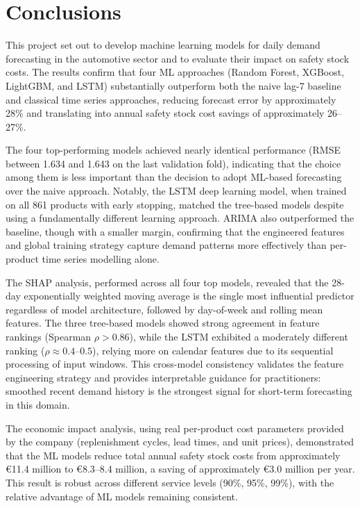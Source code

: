 
\section{Conclusions}

This project set out to develop machine learning models for daily demand forecasting in the automotive sector and to evaluate their impact on safety stock costs. The results confirm that four ML approaches (Random Forest, XGBoost, LightGBM, and LSTM) substantially outperform both the naive lag-7 baseline and classical time series approaches, reducing forecast error by approximately 28\% and translating into annual safety stock cost savings of approximately 26--27\%.

The four top-performing models achieved nearly identical performance (RMSE between 1.634 and 1.643 on the last validation fold), indicating that the choice among them is less important than the decision to adopt ML-based forecasting over the naive approach. Notably, the LSTM deep learning model, when trained on all 861 products with early stopping, matched the tree-based models despite using a fundamentally different learning approach. ARIMA also outperformed the baseline, though with a smaller margin, confirming that the engineered features and global training strategy capture demand patterns more effectively than per-product time series modelling alone.

The SHAP analysis, performed across all four top models, revealed that the 28-day exponentially weighted moving average is the single most influential predictor regardless of model architecture, followed by day-of-week and rolling mean features. The three tree-based models showed strong agreement in feature rankings (Spearman $\rho > 0.86$), while the LSTM exhibited a moderately different ranking ($\rho \approx 0.4$--$0.5$), relying more on calendar features due to its sequential processing of input windows. This cross-model consistency validates the feature engineering strategy and provides interpretable guidance for practitioners: smoothed recent demand history is the strongest signal for short-term forecasting in this domain.

The economic impact analysis, using real per-product cost parameters provided by the company (replenishment cycles, lead times, and unit prices), demonstrated that the ML models reduce total annual safety stock costs from approximately \euro11.4 million to \euro8.3--8.4 million, a saving of approximately \euro3.0 million per year. This result is robust across different service levels (90\%, 95\%, 99\%), with the relative advantage of ML models remaining consistent.

